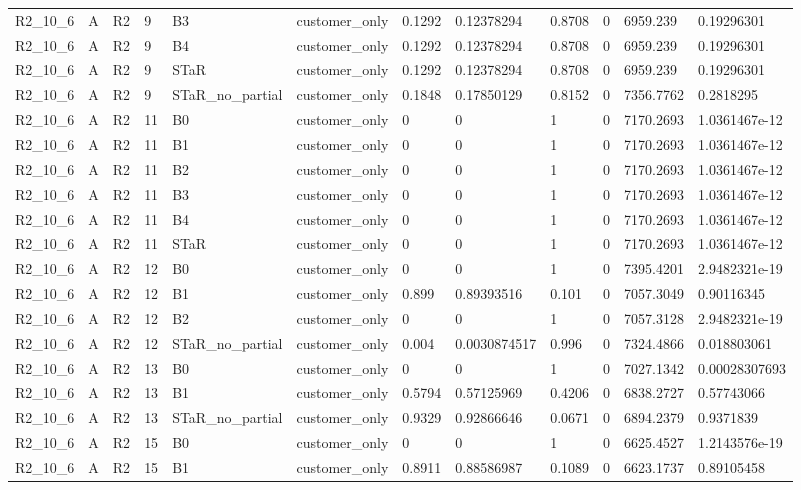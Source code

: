 \begin{longtable}{llllllllllll}
R2\_10\_6 & A & R2 & 9 & B3 & customer\_only & 0.1292 & 0.12378294 & 0.8708 & 0 & 6959.239 & 0.19296301 \\
R2\_10\_6 & A & R2 & 9 & B4 & customer\_only & 0.1292 & 0.12378294 & 0.8708 & 0 & 6959.239 & 0.19296301 \\
R2\_10\_6 & A & R2 & 9 & STaR & customer\_only & 0.1292 & 0.12378294 & 0.8708 & 0 & 6959.239 & 0.19296301 \\
R2\_10\_6 & A & R2 & 9 & STaR\_no\_partial & customer\_only & 0.1848 & 0.17850129 & 0.8152 & 0 & 7356.7762 & 0.2818295 \\
R2\_10\_6 & A & R2 & 11 & B0 & customer\_only & 0 & 0 & 1 & 0 & 7170.2693 & 1.0361467e-12 \\
R2\_10\_6 & A & R2 & 11 & B1 & customer\_only & 0 & 0 & 1 & 0 & 7170.2693 & 1.0361467e-12 \\
R2\_10\_6 & A & R2 & 11 & B2 & customer\_only & 0 & 0 & 1 & 0 & 7170.2693 & 1.0361467e-12 \\
R2\_10\_6 & A & R2 & 11 & B3 & customer\_only & 0 & 0 & 1 & 0 & 7170.2693 & 1.0361467e-12 \\
R2\_10\_6 & A & R2 & 11 & B4 & customer\_only & 0 & 0 & 1 & 0 & 7170.2693 & 1.0361467e-12 \\
R2\_10\_6 & A & R2 & 11 & STaR & customer\_only & 0 & 0 & 1 & 0 & 7170.2693 & 1.0361467e-12 \\
R2\_10\_6 & A & R2 & 12 & B0 & customer\_only & 0 & 0 & 1 & 0 & 7395.4201 & 2.9482321e-19 \\
R2\_10\_6 & A & R2 & 12 & B1 & customer\_only & 0.899 & 0.89393516 & 0.101 & 0 & 7057.3049 & 0.90116345 \\
R2\_10\_6 & A & R2 & 12 & B2 & customer\_only & 0 & 0 & 1 & 0 & 7057.3128 & 2.9482321e-19 \\
R2\_10\_6 & A & R2 & 12 & STaR\_no\_partial & customer\_only & 0.004 & 0.0030874517 & 0.996 & 0 & 7324.4866 & 0.018803061 \\
R2\_10\_6 & A & R2 & 13 & B0 & customer\_only & 0 & 0 & 1 & 0 & 7027.1342 & 0.00028307693 \\
R2\_10\_6 & A & R2 & 13 & B1 & customer\_only & 0.5794 & 0.57125969 & 0.4206 & 0 & 6838.2727 & 0.57743066 \\
R2\_10\_6 & A & R2 & 13 & STaR\_no\_partial & customer\_only & 0.9329 & 0.92866646 & 0.0671 & 0 & 6894.2379 & 0.9371839 \\
R2\_10\_6 & A & R2 & 15 & B0 & customer\_only & 0 & 0 & 1 & 0 & 6625.4527 & 1.2143576e-19 \\
R2\_10\_6 & A & R2 & 15 & B1 & customer\_only & 0.8911 & 0.88586987 & 0.1089 & 0 & 6623.1737 & 0.89105458 \\

\end{longtable}
